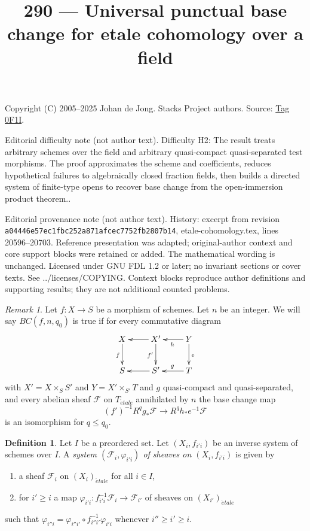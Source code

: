 \documentclass{amsart}
\theoremstyle{plain}
\theoremstyle{definition}
\newtheorem{definition}[subsection]{Definition}
\theoremstyle{remark}
\newtheorem{remark}[subsection]{Remark}
\numberwithin{equation}{subsection}
\def\etale{{\acute{e}tale}}
\begin{document}
\title[Stacks Project, Tag 0F1I]{290 --- Universal punctual base change for etale cohomology over a field}
\maketitle
\noindent Copyright (C) 2005--2025 Johan de Jong. Stacks Project authors. Source: \href{https://stacks.math.columbia.edu/tag/0F1I}{Tag 0F1I}.

\noindent Editorial difficulty note (not author text). Difficulty H2: The result treats arbitrary schemes over the field and arbitrary quasi-compact quasi-separated test morphisms. The proof approximates the scheme and coefficients, reduces hypothetical failures to algebraically closed fraction fields, then builds a directed system of finite-type opens to recover base change from the open-immersion product theorem..

\noindent Editorial provenance note (not author text). History: excerpt from revision \texttt{a0444\allowbreak 6e57e\allowbreak c1fbc\allowbreak 252a8\allowbreak 71afc\allowbreak ec775\allowbreak 2fb28\allowbreak 07b14}, etale-cohomology.tex, lines 20596--20703. Reference presentation was adapted; original-author context and core support blocks were retained or added. The mathematical wording is unchanged. Licensed under GNU FDL 1.2 or later; no invariant sections or cover texts. See ../licenses/COPYING. Context blocks reproduce author definitions and supporting results; they are not additional counted problems.

\begin{remark}
\label{remark-base-change-holds}
Let $f : X \to S$ be a morphism of schemes. Let $n$ be an integer.
We will say $BC(f, n, q_0)$ is true if for every commutative diagram
$$
\xymatrix{
X \ar[d]_f & X' \ar[l] \ar[d]_{f'} & Y \ar[l]^h \ar[d]^e \\
S & S' \ar[l] & T \ar[l]_g
}
$$
with $X' = X \times_S S'$ and $Y = X' \times_{S'} T$ and
$g$ quasi-compact and quasi-separated, and every abelian sheaf
$\mathcal{F}$ on $T_\etale$ annihilated by $n$ the base change map
$$
(f')^{-1}R^qg_*\mathcal{F}
\longrightarrow
R^qh_*e^{-1}\mathcal{F}
$$
is an isomorphism for $q \leq q_0$.
\end{remark}

\begin{definition}
\label{definition-inverse-system-sheaves}
Let $I$ be a preordered set. Let $(X_i, f_{i'i})$ be an inverse
system of schemes over $I$.
A {\it system $(\mathcal{F}_i, \varphi_{i'i})$ of sheaves
on $(X_i, f_{i'i})$} is given by
\begin{enumerate}
\item a sheaf $\mathcal{F}_i$ on $(X_i)_\etale$ for all $i \in I$,
\item for $i' \geq i$ a map
$\varphi_{i'i} : f_{i'i}^{-1}\mathcal{F}_i \to \mathcal{F}_{i'}$
of sheaves on $(X_{i'})_\etale$
\end{enumerate}
such that $\varphi_{i''i} = \varphi_{i''i'} \circ f_{i'' i'}^{-1}\varphi_{i'i}$
whenever $i'' \geq i' \geq i$.
\end{definition}
\end{document}

